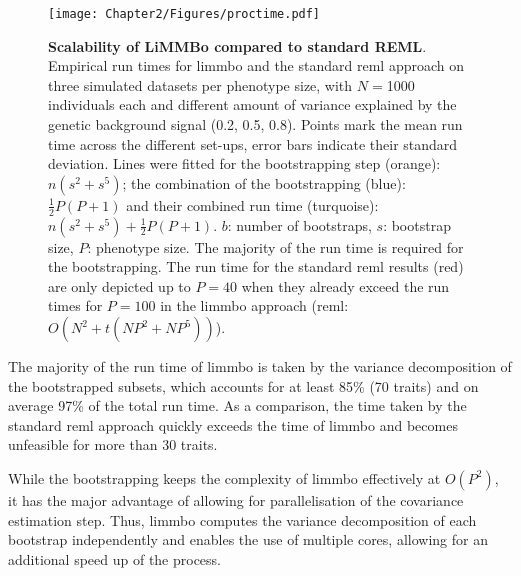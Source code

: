 \begin{figure}[H]
	\centering
	\texttt{[image: Chapter2/Figures/proctime.pdf]}
	\caption[\textbf{Scalability of LiMMBo compared to standard REML.}]{\textbf{Scalability of LiMMBo compared to standard REML}. Empirical run times for \gls{limmbo} and the standard \gls{reml} approach on three simulated datasets per phenotype size, with \(N=\)\num{1000} individuals each and different amount of variance explained by the genetic background signal (\num{0.2}, \num{0.5}, \num{0.8}). Points mark the mean run time across the different set-ups, error bars indicate their standard deviation. Lines were fitted for the bootstrapping step (orange): \(n(s^2 + s^5)\); the combination of the bootstrapping (blue): \(\frac{1}{2}P(P+1)\) and their combined run time (turquoise):  \(n(s^2 + s^5) + \frac{1}{2}P(P+1)\). \(b\): number of bootstraps, \(s\): bootstrap size, \(P\): phenotype size. The majority of the run time is required for the bootstrapping. The run time for the standard \gls{reml} results (red) are only depicted up to \(P=40\) when they already exceed the run times for \(P=100\) in the \gls{limmbo} approach (\gls{reml}: \(O(N^2 + t(NP^2 + NP^5))\)).}
	 	\label{fig:proctime}
\end{figure}
%
The majority of the run time of \gls{limmbo} is taken by the variance decomposition of the bootstrapped subsets, which accounts for at least \num{85}\%  (\num{70} traits) and on average \num{97}\%  of the total run time. As a comparison, the time taken by the standard \gls{reml} approach quickly exceeds the time of \gls{limmbo} and becomes unfeasible for more than \num{30} traits. 
 
While the bootstrapping keeps the complexity of \gls{limmbo} effectively at \(O(P^2)\), it has the major advantage of allowing for parallelisation of the covariance estimation step. Thus, \gls{limmbo} computes the variance decomposition of each bootstrap independently and enables the use of multiple cores, allowing for an additional speed up of the process. 


